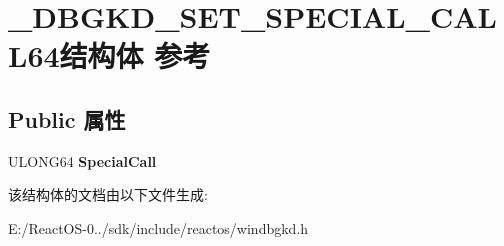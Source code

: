 \hypertarget{struct___d_b_g_k_d___s_e_t___s_p_e_c_i_a_l___c_a_l_l64}{}\section{\+\_\+\+D\+B\+G\+K\+D\+\_\+\+S\+E\+T\+\_\+\+S\+P\+E\+C\+I\+A\+L\+\_\+\+C\+A\+L\+L64结构体 参考}
\label{struct___d_b_g_k_d___s_e_t___s_p_e_c_i_a_l___c_a_l_l64}
\subsection*{Public 属性}
\begin{DoxyCompactItemize}
\item 
\mbox{\label{struct___d_b_g_k_d___s_e_t___s_p_e_c_i_a_l___c_a_l_l64_ad09d9def7b4d38f75fc010a8aad0c6f6}} 
U\+L\+O\+N\+G64 {\bfseries Special\+Call}
\end{DoxyCompactItemize}


该结构体的文档由以下文件生成\+:\begin{DoxyCompactItemize}
\item 
E\+:/\+React\+O\+S-\/0../sdk/include/reactos/windbgkd.\+h\end{DoxyCompactItemize}
